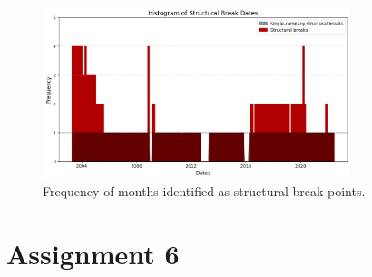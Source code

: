 \documentclass[12pt, openright, twoside]{report}
\begin{document}
\begin{figure}[h]
    \centering
    \includegraphics[width=0.8\textwidth]{images/struct_break_freqs.png}
    \caption{Frequency of months identified as structural break points.}\label{fig:struct_break_freqs}
\end{figure}
\section*{Assignment 6}
\end{document}
